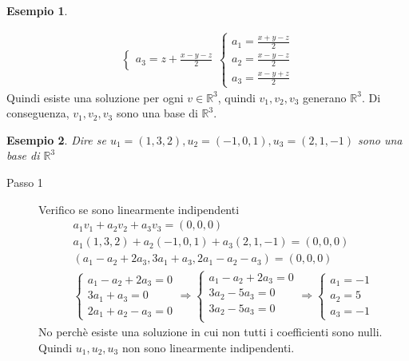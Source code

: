 \documentclass[a4paper]{article}
\theoremstyle{definition}
\newtheorem*{es}{Esempio}
\begin{document}
\begin{es}
\begin{description}
\begin{align*}
\begin{cases}
				      a_3 = z + \frac{x - y - z}{2}
			      \end{cases}
			      \begin{cases}
				      a_1 = \frac{x + y - z}{2} \\
				      a_2 = \frac{x - y - z}{2} \\
				      a_3 = \frac{x - y + z}{2}
			      \end{cases}
		      \end{align*}
		      Quindi esiste una soluzione per ogni $v \in \mathbb{R}^3$, quindi $v_1, v_2, v_3$ generano $\mathbb{R}^3$.
		      Di conseguenza, $v_1, v_2, v_3$ sono una base di $\mathbb{R}^3$.
	\end{description}
\end{es}
\begin{es}
	\textit{Dire se $u_1 = (1, 3, 2), u_2 = (-1, 0, 1), u_3 = (2, 1, -1)$ sono una base di $\mathbb{R}^3$}
	\begin{description}
		\item[Passo 1] Verifico se sono linearmente indipendenti
		      \begin{align*}
			      a_1v_1 + a_2v_2 + a_3v_3 = (0, 0, 0)                         \\
			      a_1(1, 3, 2) + a_2(-1, 0, 1) + a_3(2, 1, -1) = (0, 0, 0)     \\
			      (a_1 - a_2 + 2a_3, 3a_1 + a_3, 2a_1 - a_2 - a_3) = (0, 0, 0) \\
			      \begin{cases}
				      a_1 - a_2 + 2a_3 = 0 \\
				      3a_1 + a_3 = 0       \\
				      2a_1 + a_2 - a_3 = 0
			      \end{cases}
			      \Rightarrow
			      \begin{cases}
				      a_1 - a_2 + 2a_3 = 0 \\
				      3a_2 - 5a_3 = 0      \\
				      3a_2 - 5a_3 = 0      \\
			      \end{cases}
			      \Rightarrow
			      \begin{cases}
				      a_1 = - 1 \\
				      a_2 = 5   \\
				      a_3 = - 1
			      \end{cases}
		      \end{align*}
		      No perchè esiste una soluzione in cui non tutti i coefficienti sono nulli. Quindi $u_1, u_2, u_3$ non sono linearmente indipendenti.

\end{description}
\end{es}
\end{document}
